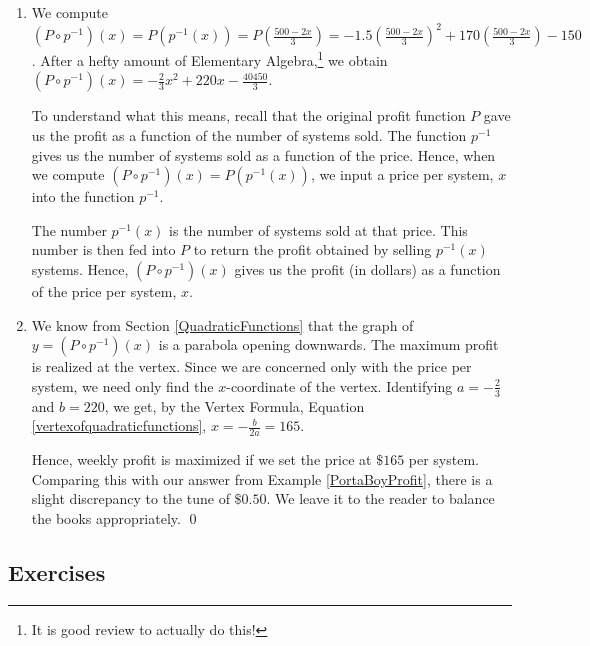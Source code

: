 \documentclass{ximera}
\begin{document}
\begin{example}
\begin{enumerate}
\item  We compute $\left( P \circ p^{-1}\right)(x) = P \left(p^{-1}(x)\right) = P\left(\frac{500-2x}{3}\right) =  -1.5\left(\frac{500-2x}{3}\right)^2+170\left(\frac{500-2x}{3}\right)-150$. After a hefty amount of Elementary Algebra,\footnote{It is good review to actually do this!} we obtain $\left( P \circ p^{-1}\right)(x) = -\frac{2}{3} x^2 +220x - \frac{40450}{3}$.  

\smallskip

To understand what this means, recall that the original profit function $P$ gave us the profit as a function of the number of systems sold.  The function $p^{-1}$ gives us the number of systems sold as a function of the price.  Hence, when we compute $(P \circ p^{-1})(x) = P(p^{-1}(x))$, we input a price per system, $x$ into the function $p^{-1}$.  

\smallskip

The number $p^{-1}(x)$ is the number of systems sold at that price.  This number is then  fed into $P$ to return the  profit obtained by selling $p^{-1}(x)$ systems.  Hence, $\left(P \circ p^{-1}\right)(x)$ gives us the  profit (in dollars) as a function of the price per system, $x$.

\item  We know from Section \ref{QuadraticFunctions} that the graph of $y = \left( P \circ p^{-1}\right)(x)$ is a parabola opening downwards.  The maximum profit is realized at the vertex. Since we are concerned only with the price per system, we need only find the $x$-coordinate of the vertex.  Identifying $a = -\frac{2}{3}$ and $b = 220$, we get, by the Vertex Formula, Equation \ref{vertexofquadraticfunctions},  $x = -\frac{b}{2a} = 165$.  

\smallskip

Hence, weekly profit is maximized if we set the price at $\$165$ per system.  Comparing this with our answer from Example \ref{PortaBoyProfit}, there is a slight discrepancy to the tune of $\$0.50$.  We leave it to the reader to balance the books appropriately.  \qed 

\end{enumerate}

\end{example}

\newpage

\subsection{Exercises}


\closegraphsfile
\end{document}
